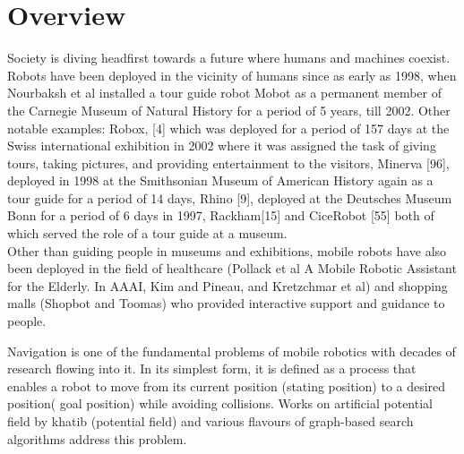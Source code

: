 \label{ch:introduction}
\section{Overview}
Society is diving headfirst towards a future where humans and machines coexist. Robots have been deployed in the vicinity of humans since as early as 1998, when Nourbaksh et al installed a tour guide robot Mobot as a permanent member of the Carnegie Museum of Natural History for a period of 5 years, till 2002. Other notable examples: Robox, [4] which was deployed for a period of 157 days at the Swiss international exhibition in 2002 where it was assigned the task of giving tours, taking pictures, and providing entertainment to the visitors, Minerva [96], deployed in 1998 at the Smithsonian Museum of American History again as a tour guide for a period of 14 days, Rhino [9], deployed at the Deutsches Museum Bonn for a period of 6 days in 1997, Rackham[15] and CiceRobot [55] both of which served the role of a tour guide at a museum. \\

Other than guiding people in museums and exhibitions, mobile robots have also been deployed in the field of healthcare (Pollack et al A Mobile Robotic Assistant for the Elderly. In AAAI, Kim and Pineau, and Kretzchmar et al) and shopping malls (Shopbot and Toomas) who provided interactive support and guidance to people. 



Navigation is one of the fundamental problems of mobile robotics with decades of research flowing into it. In its simplest form, it is defined as a process that enables a robot to move from its current position (stating position) to a desired position( goal position) while avoiding collisions. Works on artificial potential field by khatib (potential field) and various flavours of graph-based search algorithms address this problem.\\

